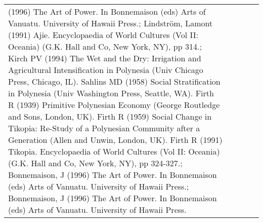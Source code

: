 \begin{longtable}{p{1.8cm}p{1.8cm}p{1.8cm}p{2cm}p{7cm}}
(1996) The Art of Power. In Bonnemaison (eds) Arts of Vanuatu. University of Hawaii Press.; Lindström, Lamont (1991) Ajie. Encyclopaedia of World Cultures (Vol II: Oceania) (G.K. Hall and Co, New York, NY), pp 314.; Kirch PV (1994) The Wet and the Dry: Irrigation and Agricultural Intensification in Polynesia (Univ Chicago Press, Chicago, IL). Sahlins MD (1958) Social Stratification in Polynesia (Univ Washington Press, Seattle, WA). Firth R (1939) Primitive Polynesian Economy (George Routledge and Sons, London, UK). Firth R (1959) Social Change in Tikopia: Re-Study of a Polynesian Community after a Generation (Allen and Unwin, London, UK). Firth R (1991) Tikopia. Encyclopaedia of World Cultures (Vol II: Oceania) (G.K. Hall and Co, New York, NY), pp 324-327.; Bonnemaison, J (1996) The Art of Power. In Bonnemaison (eds) Arts of Vanuatu. University of Hawaii Press.; Bonnemaison, J (1996) The Art of Power. In Bonnemaison (eds) Arts of Vanuatu. University of Hawaii Press. \\ 

\end{longtable}
